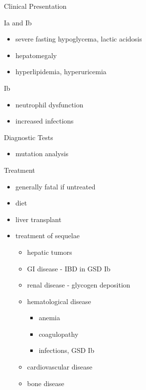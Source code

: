 \documentclass[presentation, smaller]{beamer}
\begin{document}
\begin{frame}[label={sec:org3120746}]{Clinical Presentation}
\begin{block}{Ia and Ib}
\begin{itemize}
\item severe fasting hypoglycema, lactic acidosis
\item hepatomegaly
\item hyperlipidemia, hyperuricemia
\end{itemize}
\end{block}
\begin{block}{Ib}
\begin{itemize}
\item neutrophil dysfunction
\item increased infections
\end{itemize}
\end{block}
\end{frame}

\begin{frame}[label={sec:org4021e3d}]{Diagnostic Tests}
\begin{itemize}
\item mutation analysis
\end{itemize}
\end{frame}

\begin{frame}[label={sec:org505b77c}]{Treatment}
\begin{itemize}
\item generally fatal if untreated
\item diet
\item liver transplant
\item treatment of sequelae
\begin{itemize}
\item hepatic tumors
\item GI disease - IBD in GSD Ib
\item renal disease - glycogen deposition
\item hematological disease
\begin{itemize}
\item anemia
\item coagulopathy
\item infections, GSD Ib
\end{itemize}
\item cardiovascular disease
\item bone disease
\end{itemize}
\end{itemize}
\end{frame}
\end{document}
